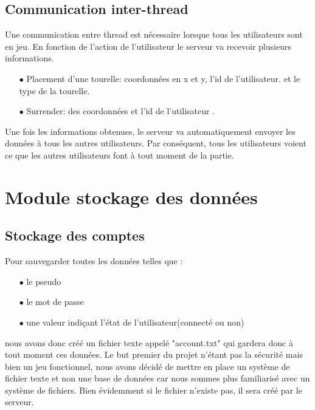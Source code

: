 \documentclass[12pt,a4paper]{article}
\begin{document}
\subsection{Communication inter-\gls{thread}}
Une communication entre \gls{thread}  est nécessaire lorsque tous les utilisateurs  sont en jeu. En fonction de l'action de l'utilisateur  le serveur va recevoir plusieurs informations.
\begin{itemize}
\item[$\bullet$] Placement d'une tourelle: coordonnées en x et y, l'id de l'utilisateur.  et le type de la tourelle.
\item[$\bullet$] Surrender: des coordonnées et l'id de l'utilisateur .
\end{itemize}
Une fois les informations obtenues, le serveur va automatiquement envoyer les données à tous les autres utilisateurs. Par conséquent, tous les utilisateurs voient ce que les autres utilisateurs font à tout moment de la partie.
\newpage
\section{Module stockage des données}
\subsection{Stockage des comptes}
Pour sauvegarder toutes les données telles que :
\begin{itemize}
\item[$\bullet$] le \gls{pseudo} 
\item[$\bullet$] le mot de passe
\item[$\bullet$] une valeur indiçant l'état de l'utilisateur(connecté ou non) 
\end{itemize}
nous avons donc créé un fichier texte appelé "account.txt" qui gardera donc à tout moment ces données. Le but premier du projet n'étant pas la sécurité mais bien un jeu fonctionnel, nous avons décidé de mettre en place un système de fichier texte et non une base de données car nous sommes plus familiarisé avec un système de fichiers. Bien évidemment si le fichier n'existe pas, il sera créé par le serveur.
\end{document}
